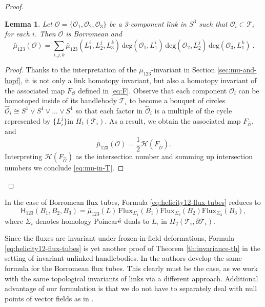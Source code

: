 \documentclass[12pt]{article}
\numberwithin{equation}{section}
\newtheorem{lemma}[theorem]{Lemma}
\newcommand{\no}{\noindent}
\begin{document}
\begin{proof}
\begin{lemma}
 Let $\mathcal{O}=\{\mathcal{O}_1,\mathcal{O}_2, \mathcal{O}_3\}$ be a 3-component link in $S^3$ such that 
 $\mathcal{O}_i\subset \mathcal{T}_i$ for each $i$. Then $\mathcal{O}$ is Borromean and 
  \begin{equation}\label{eq:mu-in-T}
 \bar{\mu}_{123}(\mathcal{O})=\sum_{i, j, k} \bar{\mu}_{123}(L^i_1, L^j_2, L^k_3)\,\text{deg}(\mathcal{O}_1, L^i_1)\,\text{deg}(\mathcal{O}_2, L^j_2)\,\text{deg}(\mathcal{O}_3, L^k_1)\ .
 \end{equation}
\end{lemma}
\begin{proof}
 Thanks to the interpretation of the $\bar{\mu}_{123}$-invariant in Section \ref{sec:mu-and-hopf}, it is not only a link homotopy 
 invariant, but also a homotopy invariant of the associated map $F_{\mathcal{O}}$ defined in \eqref{eq:F}. Observe that  each component 
 $\mathcal{O}_i$ can be homotoped inside of its handlebody $\mathcal{T}_i$ to become a bouquet of circles $\widehat{\mathcal{O}}_i\cong S^1\vee S^1\vee\ldots\vee S^1$ so that each factor in $\widehat{\mathcal{O}}_i$ is a multiple of the cycle represented by $\{L^j_i\}$in $H_1(\mathcal{T}_i)$. As a result, we obtain the associated map
 $F_{\widehat{\mathcal{O}}}$, and
 \[
  \bar{\mu}_{123}(\mathcal{O})=\frac{1}{2}\mathscr{H}(F_{\widehat{\mathcal{O}}}).
 \]
 Interpreting $\mathscr{H}(F_{\widehat{\mathcal{O}}})$ as the intersection number and summing up
 intersection numbers we conclude \eqref{eq:mu-in-T}.
\end{proof}
\end{proof}

\no In the case of Borromean flux tubes, Formula \eqref{eq:helicity12-flux-tubes} reduces to
\begin{equation}\label{eq:helicity12-borro-flux-tubes}
\mathsf{H}_{123}(B_1,B_2,B_3)=\bar{\mu}_{123}(L)\,\text{Flux}_{\Sigma_1}(B_1)
\text{Flux}_{\Sigma_2}(B_2)\text{Flux}_{\Sigma_3}(B_3),
\end{equation}
where $\Sigma_i$ denotes homology Poincar$\acute{\rm e}$ duals to $L_i$ in $H_2(\mathcal{T}_i,\partial\mathcal{T}_i)$.


  Since the fluxes are invariant under frozen-in-field deformations, Formula \eqref{eq:helicity12-flux-tubes}
  is yet another proof of Theorem \ref{th:invariance-th} in the setting of invariant unlinked handlebodies.
  In \cite{Laurence-Stredulinsky00b} the authors develop the same formula for the Borromean flux tubes.
  This clearly must be the case, as we work with the same topological 
  invariants of links via a different approach. Additional advantage 
  of our formulation is that we do not have to separately 
  deal with null points of vector fields as in \cite{Laurence-Stredulinsky00b}. 
\end{document}

